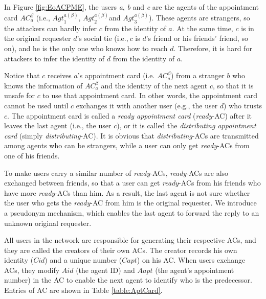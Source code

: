 \documentclass[conference]{IEEEtran}
\begin{document}
In Figure \ref{fig:EoACPME}, the users \textit{a}, \textit{b} and \textit{c} are the agents of the appointment card ${AC}^{\beta }_a$ (i.e., ${Agt}^{a\left(\beta \right)}_1$, ${Agt}^{a\left(\beta \right)}_2$and ${Agt}^{a\left(\beta \right)}_3$). These agents are strangers, so the attackers can hardly infer $c$ from the identity of $a$. At the same time, $c$ is in the original requester $d$'s social tie (i.e.,$\ c$ is $d$'s friend or his friends' friend, so on), and he is the only one who knows how to reach $d$. Therefore, it is hard for attackers to infer the identity of $d$ from the identity of $a$.

Notice that $c$ receives $a$'s appointment card (i.e. ${AC}^{\beta }_a$) from a stranger $b$ who knows the information of ${AC}^{\beta }_a$ and the identity of the next agent $c$, so that it is unsafe for $c$ to use that appointment card. In other words, the appointment card cannot be used until $c$ exchanges it with another user (e.g., the user $d$) who trusts $c$. The appointment card is called a \textit{ready appointment card} (\textit{ready}-AC) after it leaves the last agent (i.e., the user $c$), or it is called the \textit{distributing appointment card} (simply \textit{distributing}-AC). It is obvious that \textit{distributing}-ACs are transmitted among agents who can be strangers, while a user can only get \textit{ready}-ACs from  one of his friends.

To make users carry a similar number of \textit{ready}-ACs, \textit{ready}-ACs are also exchanged between friends, so that a user can get \textit{ready}-ACs from his friends who have more \textit{ready}-ACs than him. As a result, the last agent is not sure whether the user who gets the \textit{ready}-AC from him is the original requester. We introduce a pseudonym mechanism, which enables the last agent to forward the reply to an unknown original requester. 

All users in the network are responsible for generating their respective ACs, and they are called the creators of their own ACs. The creator records his own identity ($Cid$) and a unique number ($Capt$) on his AC. When users exchange ACs, they modify $Aid$ (the agent ID) and ${Aapt}$ (the agent's appointment number) in the AC to enable the next agent to identify who is the predecessor. Entries of AC are shown in Table \ref{table:AptCard}.
\end{document}
